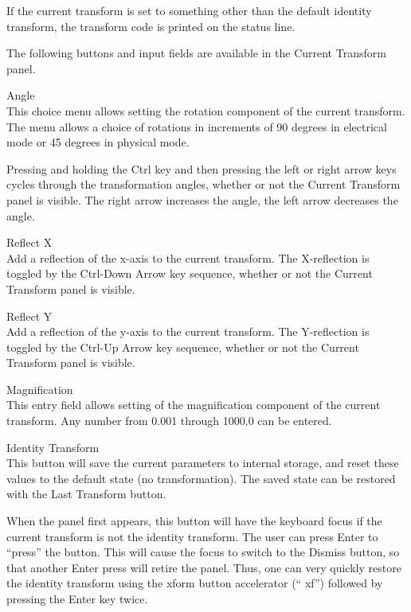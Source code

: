 If the current transform is set to something other than the default
identity transform, the transform code is printed on the status line.

The following buttons and input fields are available in the
{\cb Current Transform} panel.

\begin{description}
\item{\cb Angle}\\
This choice menu allows setting the rotation component of the current
transform.  The menu allows a choice of rotations in increments of 90
degrees in electrical mode or 45 degrees in physical mode.

Pressing and holding the {\kb Ctrl} key and then pressing the left or
right arrow keys cycles through the transformation angles, whether or
not the {\cb Current Transform} panel is visible.  The right arrow
increases the angle, the left arrow decreases the angle.

\item{\cb Reflect X}\\
Add a reflection of the x-axis to the current transform.  The
X-reflection is toggled by the {\kb Ctrl-Down Arrow} key sequence,
whether or not the {\cb Current Transform} panel is visible.

\item{\cb Reflect Y}\\
Add a reflection of the y-axis to the current transform.  The
Y-reflection is toggled by the {\kb Ctrl-Up Arrow} key sequence,
whether or not the {\cb Current Transform} panel is visible.

\item{\cb Magnification}\\
This entry field allows setting of the magnification component of the
current transform.  Any number from 0.001 through 1000.0 can be
entered.

\item{\cb Identity Transform}\\
This button will save the current parameters to internal storage, and
reset these values to the default state (no transformation).  The
saved state can be restored with the {\cb Last Transform} button.

When the panel first appears, this button will have the keyboard focus
if the current transform is not the identity transform.  The user can
press {\kb Enter} to ``press'' the button.  This will cause the focus
to switch to the {\cb Dismiss} button, so that another {\kb Enter}
press will retire the panel.  Thus, one can very quickly restore the
identity transform using the {\cb xform} button accelerator (``{\vt
xf}'') followed by pressing the {\kb Enter} key twice.


\end{description}
